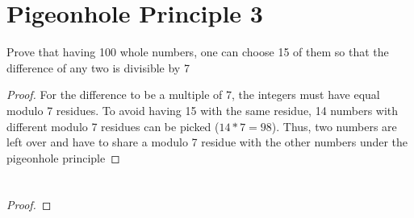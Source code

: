\documentclass{article}
\renewcommand{\(}{\left(}
\renewcommand{\)}{\right)}
\theoremstyle{plain}
\theoremstyle{plain}
\theoremstyle{definition}
\begin{document}
\section{Pigeonhole Principle 3}
Prove that having 100 whole numbers, one can choose 15 of them so that the difference of any two is divisible by 7
\begin{shaded}
\begin{proof}
For the difference to be a multiple of 7, the integers must have equal modulo 7 residues. To avoid having 15 with the same residue, 14 numbers with different modulo 7 residues can be picked ($14 * 7 = 98$). Thus, two numbers are left over and have to share a modulo 7 residue with the other numbers under the pigeonhole principle
\end{proof}
\end{shaded}

\section{}

\begin{shaded}
\begin{proof}

\end{proof}
\end{shaded}
\end{document}

